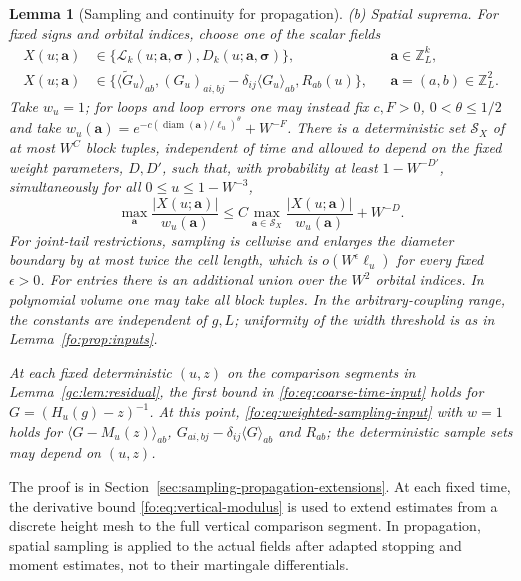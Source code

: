\documentclass[11pt]{article}
\numberwithin{equation}{section}
\newtheorem{lemma}[theorem]{Lemma}
\theoremstyle{remark}
\newcommand{\Z}{\mathbb Z}
\newcommand{\wt}{\widetilde}
\newcommand{\diam}{\operatorname{diam}}
\newcommand{\cL}{\mathcal L}
\begin{document}
\begin{lemma}[Sampling and continuity for propagation]
\textup{(b) Spatial suprema.}
For fixed signs and orbital indices, choose one of the scalar fields
\[
 \begin{aligned}
 X(u;\boldsymbol a)&\in\{\cL_k(u;\boldsymbol a,\boldsymbol\sigma),
                   D_k(u;\boldsymbol a,\boldsymbol\sigma)\},
                   &&\boldsymbol a\in\Z_L^k,\\
 X(u;\boldsymbol a)&\in\{\langle\wt G_u\rangle_{ab},
   (G_u)_{ai,bj}-\delta_{ij}\langle G_u\rangle_{ab},R_{ab}(u)\},
                   &&\boldsymbol a=(a,b)\in\Z_L^2.
 \end{aligned}
\]
Take $w_u=1$; for loops and loop errors one may instead fix $c,F>0$,
$0<\theta\le1/2$ and take
$w_u(\boldsymbol a)=e^{-c(\diam(\boldsymbol a)/\ell_u)^\theta}+W^{-F}$.
There is a deterministic set $\mathcal S_X$ of at most $W^C$ block tuples,
independent of time and allowed to depend on the fixed weight parameters,
$D,D'$, such that, with probability at least $1-W^{-D'}$, simultaneously
for all $0\le u\le1-W^{-3}$,
\begin{equation}\label{fo:eq:weighted-sampling-input}
 \max_{\boldsymbol a}\frac{|X(u;\boldsymbol a)|}{w_u(\boldsymbol a)}
 \le C\max_{\boldsymbol a\in\mathcal S_X}
             \frac{|X(u;\boldsymbol a)|}{w_u(\boldsymbol a)}+W^{-D}.
\end{equation}
For joint-tail restrictions, sampling is cellwise and enlarges the
diameter boundary by at most twice the cell length, which is
$o(W^\epsilon\ell_u)$ for every fixed $\epsilon>0$.
For entries there is an additional union over the $W^2$ orbital indices.
In polynomial volume one may take all block tuples. In the
arbitrary-coupling range, the constants are independent of $g,L$;
uniformity of the width threshold is as in Lemma~\ref{fo:prop:inputs}.

At each fixed deterministic $(u,z)$ on the comparison segments in
Lemma~\ref{gc:lem:residual}, the first bound in
\eqref{fo:eq:coarse-time-input} holds for $G=(H_u(g)-z)^{-1}$.
At this point, \eqref{fo:eq:weighted-sampling-input} with $w=1$ holds
for $\langle G-M_u(z)\rangle_{ab}$,
$G_{ai,bj}-\delta_{ij}\langle G\rangle_{ab}$ and $R_{ab}$;
the deterministic sample sets may depend on $(u,z)$.
\end{lemma}
The proof is in Section~\ref{sec:sampling-propagation-extensions}.
At each fixed time, the derivative bound \eqref{fo:eq:vertical-modulus}
is used to extend estimates from a discrete height mesh to the full
vertical comparison segment.
In propagation, spatial sampling is applied to the actual fields
after adapted stopping and moment estimates, not to their martingale
differentials.
\end{document}

